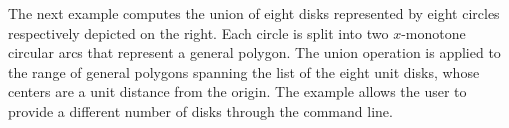 The next example computes the union of eight disks represented by
eight circles respectively depicted on the right. Each
circle is split into two $x$-monotone circular arcs that represent a
general polygon. The union operation is applied to the range of
general polygons spanning the list of the eight unit disks, whose
centers are a unit distance from the origin. The example allows the user
to provide a different number of disks through the command line.

